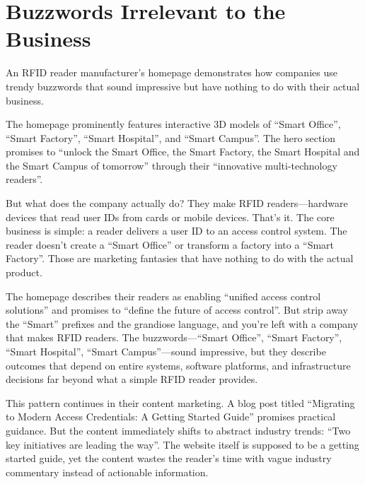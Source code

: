\section{Buzzwords Irrelevant to the Business}

An RFID reader manufacturer's homepage demonstrates how companies use trendy buzzwords that sound impressive but have nothing to do with their actual business.

The homepage prominently features interactive 3D models of ``Smart Office'', ``Smart Factory'', ``Smart Hospital'', and ``Smart Campus''. The hero section promises to ``unlock the Smart Office, the Smart Factory, the Smart Hospital and the Smart Campus of tomorrow'' through their ``innovative multi-technology readers''.

But what does the company actually do? They make RFID readers—hardware devices that read user IDs from cards or mobile devices. That's it. The core business is simple: a reader delivers a user ID to an access control system. The reader doesn't create a ``Smart Office'' or transform a factory into a ``Smart Factory''. Those are marketing fantasies that have nothing to do with the actual product.

The homepage describes their readers as enabling 
``unified access control solutions'' and promises to 
``define the future of access control''. 
But strip away the ``Smart'' prefixes and the grandiose language, 
and you're left with a company that makes RFID readers. 
The buzzwords—``Smart Office'', ``Smart Factory'', ``Smart Hospital'', ``Smart Campus''—sound impressive, but they describe outcomes that depend on entire systems, software platforms, and infrastructure decisions far beyond what a simple RFID reader provides.

This pattern continues in their content marketing. 
A blog post titled ``Migrating to Modern Access Credentials: 
A Getting Started Guide'' promises practical guidance. 
But the content immediately shifts to abstract industry trends: 
``Two key initiatives are leading the way''. 
The website itself is supposed to be a getting started guide, 
yet the content wastes the reader's time with vague industry commentary 
instead of actionable information.

